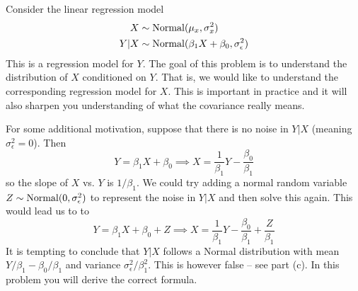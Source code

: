 \begin{exercise}

Consider the linear regression model
\begin{align*}
X &\sim {\rm Normal}(\mu_x,\sigma_x^2)\\
Y|X &\sim {\rm Normal}(\beta_1X + \beta_0,\sigma_{\epsilon}^2)
\end{align*}
This is a regression model for $Y$. The goal of this problem is to understand the distribution of $X$ conditioned on $Y$. That is, we would like to understand the corresponding regression model for $X$. This is important in practice and it will also sharpen you understanding of what the covariance really means.  


For some additional motivation, suppose that there is no noise in $Y|X$ (meaning $\sigma_{\epsilon}^2=0$). Then 
\begin{equation*}
Y =\beta_1X + \beta_0 \implies X = \frac{1}{\beta_1}Y - \frac{\beta_0}{\beta_1}
\end{equation*}
so the slope of $X$ vs.  $Y$ is $1/\beta_1$. We could try adding a normal random variable $Z \sim {\rm Normal}(0,\sigma_{\epsilon}^2)$ to represent the noise in $Y|X$ and then solve this again. This would lead us to to 
\begin{equation*}
Y =\beta_1X + \beta_0 + Z \implies X=  \frac{1}{\beta_1}Y - \frac{\beta_0}{\beta_1} + \frac{Z}{\beta_1}
\end{equation*}
It is tempting to conclude that $Y|X$ follows a Normal distribution with mean $Y/\beta_1 - \beta_0/\beta_1$ and variance $\sigma_{\epsilon}^2/\beta_1^2$. This is however false -- see part (c). In this problem you will derive the correct formula. 



\end{exercise}

